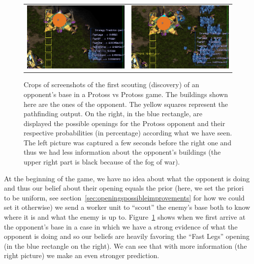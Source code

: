 \begin{figure}[h]
\begin{center}
\begin{tabular}{cc}
\includegraphics[width=0.499\columnwidth]{images/botgame/scout1.png} & 
\includegraphics[width=0.499\columnwidth]{images/botgame/scout2.png}
\end{tabular}
\caption{Crops of screenshots of the first scouting (discovery) of an opponent's base in a Protoss vs Protoss game. The buildings shown here are the ones of the opponent. The yellow squares represent the pathfinding output. On the right, in the blue rectangle, are displayed the possible openings for the Protoss opponent and their respective probabilities (in percentage) according what we have seen. The left picture was captured a few seconds before the right one and thus we had less information about the opponent's buildings (the upper right part is black because of the fog of war).}
\label{fig:bot_scout}
\end{center}
\end{figure}

At the beginning of the game, we have no idea about what the opponent is doing and thus our belief about their opening equals the prior (here, we set the priori to be uniform, see section~\ref{sec:openingspossibleimprovements} for how we could set it otherwise) we send a worker unit to ``scout'' the enemy's base both to know where it is and what the enemy is up to. Figure~\ref{fig:bot_scout} shows when we first arrive at the opponent's base in a case in which we have a strong evidence of what the opponent is doing and so our beliefs are heavily favoring the ``Fast Legs'' opening (in the blue rectangle on the right). We can see that with more information (the right picture) we make an even stronger prediction.

